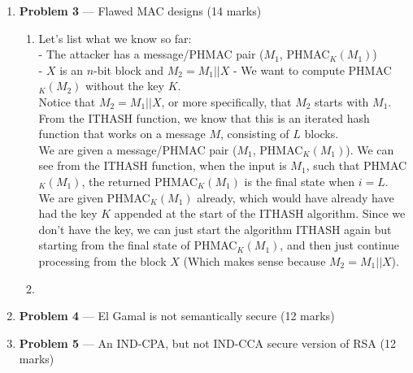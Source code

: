 \documentclass[11pt]{article}
\theoremstyle{definition}
\begin{document}
\begin{enumerate}
\begin{enumerate}
\end{enumerate}

\newpage

\item[] \textbf{Problem 3} --- Flawed MAC designs (14 marks)

\begin{enumerate}

\item 
Let's list what we know so far:\\
- The attacker has a message/PHMAC pair ($M_1$, PHMAC$_K(M_1)$)\\
- $X$ is an $n$-bit block and $M_2 = M_1||X$
- We want to compute PHMAC$_K(M_2)$ without the key $K$.\\

Notice that $M_2 = M_1||X$, or more specifically, that $M_2$ starts with $M_1$.\\

From the ITHASH function, we know that this is an iterated hash function that works on a message $M$, consisting of $L$ blocks.\\

We are given a message/PHMAC pair ($M_1$, PHMAC$_K(M_1)$). We can see from the ITHASH function, when the input is $M_1$, such that PHMAC$_K(M_1)$, the returned PHMAC$_K(M_1)$ is the final state when $i = L$.\\

We are given PHMAC$_K(M_1)$ already, which would have already have had the key $K$ appended at the start of the ITHASH algorithm. Since we don't have the key, we can just start the algorithm ITHASH again but starting from the final state of PHMAC$_K(M_1)$, and then just continue processing from the block $X$ (Which makes sense because $M_2 = M_1||X$).\\


\item %

\end{enumerate}

\newpage

\item[] \textbf{Problem 4} --- El Gamal is not semantically secure (12 marks)

\newpage

\item[] \textbf{Problem 5} --- An IND-CPA, but not IND-CCA secure version of RSA (12 marks)

\end{enumerate}
\end{document}
